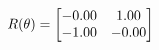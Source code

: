 \documentclass[preview]{standalone}
\begin{document}
\begin{align*}
\special{dvisvgm:raw <g id='unique000'>}R(\theta) = \begin{bmatrix}-0.00 & 1.00\\-1.00 & -0.00\end{bmatrix}\special{dvisvgm:raw </g>}
\end{align*}
\end{document}

